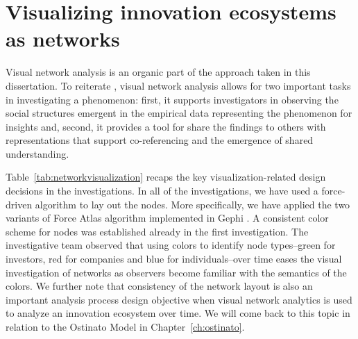 \section{Visualizing innovation ecosystems as networks}

Visual network analysis is an organic part of the approach taken in this dissertation. To reiterate \cite{Freeman2000VisualizingNetworks}, visual network analysis allows for two important tasks in investigating a phenomenon:  first, it supports investigators in observing the social structures emergent in the empirical data representing the phenomenon for insights and, second, it provides a tool for share the findings to others with representations that support co-referencing and the emergence of shared understanding. 

Table~\ref{tab:networkvisualization} recaps the key visualization-related design decisions in the investigations. In all of the investigations, we have used a force-driven algorithm to lay out the nodes. More specifically, we have applied the two variants of Force Atlas algorithm implemented in Gephi \citep{Bastian2009Gephi:Networks}. A consistent color scheme for nodes was established already in the first investigation. The investigative team observed that using colors to identify node types--green for investors, red for companies and blue for individuals--over time eases the visual investigation of networks as observers become familiar with the semantics of the colors. We further note that consistency of the network layout is also an important analysis process design objective when visual network analytics is used to analyze an innovation ecosystem over time. We will come back to this topic in relation to the Ostinato Model in Chapter~\ref{ch:ostinato}.


